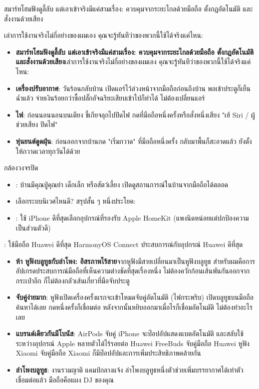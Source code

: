 
สมาร์ทโฮมฟังดูลี้ลับ แต่เอาเข้าจริงมีแค่สามเรื่อง: ควบคุมจากระยะไกลด้วยมือถือ ตั้งกฎอัตโนมัติ และสั่งงานด้วยเสียง

เล่าการใช้งานจริงไม่กี่อย่างของผมเอง คุณจะรู้ทันทีว่าของพวกนี้ใช้ได้จริงแค่ไหน:

\begin{itemize}
  \item \textbf{สมาร์ทโฮมฟังดูลี้ลับ แต่เอาเข้าจริงมีแค่สามเรื่อง: ควบคุมจากระยะไกลด้วยมือถือ ตั้งกฎอัตโนมัติ และสั่งงานด้วยเสียง}เล่าการใช้งานจริงไม่กี่อย่างของผมเอง คุณจะรู้ทันทีว่าของพวกนี้ใช้ได้จริงแค่ไหน:
  \item \textbf{เครื่องปรับอากาศ}: วันร้อนกลับบ้าน เปิดแอร์ไว้ล่วงหน้าจากมือถือก่อนถึงบ้าน พอเข้าประตูก็เย็นฉ่ำแล้ว จ่ายเงินร้อยกว่าซื้อปลั๊กอัจฉริยะเสียบเข้าไปก็ทำได้ ไม่ต้องเปลี่ยนแอร์
  \item \textbf{ไฟ}: ก่อนนอนนอนบนเตียง ขี้เกียจลุกไปปิดไฟ กดที่มือถือหนึ่งครั้งหรือสั่งหนึ่งเสียง "เฮ้ Siri / ผู้ช่วยเสียง ปิดไฟ"
  \item \textbf{หุ่นยนต์ดูดฝุ่น}: ก่อนออกจากบ้านกด "เริ่มกวาด" ที่มือถือหนึ่งครั้ง กลับมาพื้นก็สะอาดแล้ว ยังตั้งให้กวาดเวลาทุกวันได้ด้วย
\end{itemize}

กล้องวงจรปิด

\begin{itemize}
  \item : บ้านมีคุณปู่คุณย่า เด็กเล็ก หรือสัตว์เลี้ยง เปิดดูสถานการณ์ในบ้านจากมือถือได้ตลอด
  \item เลือกระบบนิเวศไหนดี? สรุปสั้น ๆ หนึ่งประโยค:
  \item : ใช้ iPhone ดีที่สุดเลือกอุปกรณ์ที่รองรับ Apple HomeKit (แพงนิดหน่อยแต่ปกป้องความเป็นส่วนตัวดี)
\end{itemize}


: ใช้มือถือ Huawei ดีที่สุด HarmonyOS Connect ประสบการณ์กับอุปกรณ์ Huawei ดีที่สุด

\begin{itemize}
  \item \textbf{ห้า หูฟังบลูทูธกับลำโพง: อิสรภาพไร้สาย}จากหูฟังมีสายเปลี่ยนมาเป็นหูฟังบลูทูธ สำหรับผมคือการอัปเกรดประสบการณ์มือถือที่เห็นความต่างชัดที่สุดเรื่องหนึ่ง ไม่ต้องควักก้อนเส้นพันกันออกจากกระเป๋าอีก ก็ไม่ต้องกลัวเส้นเกี่ยวที่มือจับประตู
  \item \textbf{จับคู่ง่ายมาก}: หูฟังเปิดเครื่องครั้งแรกจะเข้าโหมดจับคู่อัตโนมัติ (ไฟกระพริบ) เปิดบลูทูธบนมือถือค้นหาได้เลย กดหนึ่งครั้งก็เชื่อมต่อ หลังจากนั้นหยิบออกมาเมื่อไรก็เชื่อมอัตโนมัติ ไม่ต้องทำอะไรเลย
  \item \textbf{แบรนด์เดียวกันมีโบนัส}: AirPods จับคู่ iPhone จะป๊อปอัปแสดงแบตอัตโนมัติ และสลับใช้ระหว่างอุปกรณ์ Apple หลายตัวได้ไร้รอยต่อ Huawei FreeBuds จับคู่มือถือ Huawei หูฟัง Xiaomi จับคู่มือถือ Xiaomi ก็มีป๊อปอัปและการเพิ่มประสิทธิภาพคล้ายกัน
  \item \textbf{ลำโพงบลูทูธ}: งานรวมญาติ แคมป์กลางแจ้ง ลำโพงบลูทูธหนึ่งตัวช่วยเพิ่มบรรยากาศได้เท่าตัว เชื่อมต่อแล้ว มือถือคือแผง DJ ของคุณ
\end{itemize}

